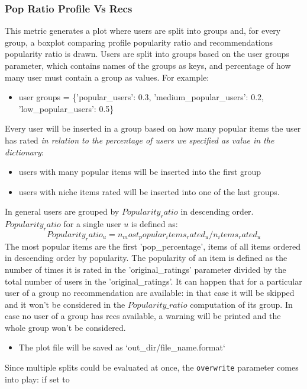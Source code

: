 \subsubsection{Pop Ratio Profile Vs Recs}\label{subsubsec:popratio}
This metric generates a plot where users are split into groups and, for every group, a boxplot comparing
profile popularity ratio and recommendations popularity ratio is drawn.
Users are split into groups based on the user groups parameter, which contains names of the groups as keys,
and percentage of how many user must contain a group as values.
For example:
\begin{itemize}
       \item user groups = \{'popular\_users': 0.3, 'medium\_popular\_users': 0.2, 'low\_popular\_users': 0.5\}
\end{itemize}
\hfill\break
\hfill\break
Every user will be inserted in a group based on how many popular items the user has rated
\textit{in relation to the percentage of users we specified as value in the dictionary}:
\begin{itemize}
    \item users with many popular items will be inserted into the first group
    \item users with niche items rated will be inserted into one of the last groups.
\end{itemize}
\hfill\break
\hfill\break
In general users are grouped by $Popularity_ratio$ in descending order. $Popularity_ratio$ for a single user $u$
is defined as:
\hfill\break
\hfill\break
    \[
        Popularity_ratio_u = n_most_popular_items_rated_u / n_items_rated_u
    \]
\hfill\break
\hfill\break
The most popular items are the first 'pop\_percentage', items of all items ordered in descending order by
popularity.
The popularity of an item is defined as the number of times it is rated in the 'original\_ratings' parameter
divided by the total number of users in the 'original\_ratings'.
It can happen that for a particular user of a group no recommendation are available: in that case it will be skipped
and it won't be considered in the $Popularity\_ratio$ computation of its group. In case no user of a group has recs
available, a warning will be printed and the whole group won't be considered.
\begin{itemize}
    \item The plot file will be saved as `out\_dir/file\_name.format`
\end{itemize}
\hfill\break
\hfill\break
Since multiple splits could be evaluated at once, the \texttt{overwrite} parameter comes into play: if set to
